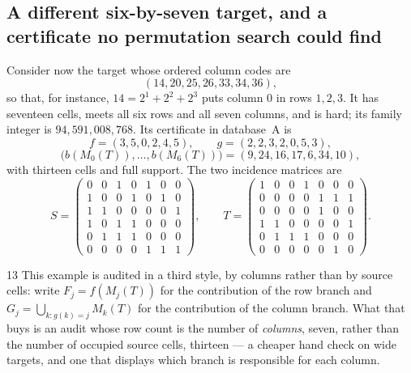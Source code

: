 \documentclass[11pt,letterpaper]{article}
\numberwithin{equation}{section}
\theoremstyle{definition}
\theoremstyle{remark}
\newcommand{\dbA}{\textsf{A}}
\begin{document}
\subsection{A different six-by-seven target, and a certificate no permutation
search could find}
\label{sec:ex-strip}
Consider now the target whose ordered column codes are
\begin{equation}\label{eq:strip-columns}
 (14,20,25,26,33,34,36),
\end{equation}
so that, for instance, $14=2^1+2^2+2^3$ puts column $0$ in rows $1,2,3$.
It has seventeen cells, meets all six rows and all seven columns, and is
hard; its family integer is $94{,}591{,}008{,}768$. Its certificate in
database~\dbA{} is
\[
 f=(3,5,0,2,4,5),\qquad
 g=(2,2,3,2,0,5,3),
\]
\[
 \bigl(b(M_0(T)),\ldots,b(M_6(T))\bigr)=(9,24,16,17,6,34,10),
\]
with thirteen cells and full support. The two incidence matrices are
\begingroup\setlength{\arraycolsep}{3pt}
\[
 S=\begin{pmatrix}
 0&0&1&0&1&0&0\\
 1&0&0&1&0&1&0\\
 1&1&0&0&0&0&1\\
 1&0&1&1&0&0&0\\
 0&1&1&1&0&0&0\\
 0&0&0&0&1&1&1
 \end{pmatrix},\qquad
 T=\begin{pmatrix}
 1&0&0&1&0&0&0\\
 0&0&0&0&1&1&1\\
 0&0&0&0&1&0&0\\
 1&1&0&0&0&0&1\\
 0&1&1&1&0&0&0\\
 0&0&0&0&0&1&0
 \end{pmatrix}.
\]
\endgroup

\begin{variantbox}{13}
This example is audited in a third style, by columns rather than by source
cells: write $F_j=f(M_j(T))$ for the contribution of the row branch and
$G_j=\bigcup_{k:g(k)=j}M_k(T)$ for the contribution of the column branch.
What that buys is an audit whose row count is the number of \emph{columns},
seven, rather than the number of occupied source cells, thirteen --- a
cheaper hand check on wide targets, and one that displays which branch is
responsible for each column.
\end{variantbox}
\end{document}

